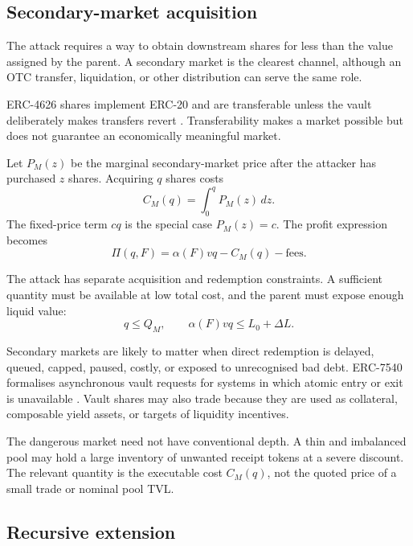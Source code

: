 \documentclass[11pt]{article}
\begin{document}
\subsection{Secondary-market acquisition}

The attack requires a way to obtain downstream shares for less than the value assigned by the parent.  A secondary market is the clearest channel, although an OTC transfer, liquidation, or other distribution can serve the same role.

ERC-4626 shares implement ERC-20 and are transferable unless the vault deliberately makes transfers revert \cite{erc4626}.  Transferability makes a market possible but does not guarantee an economically meaningful market.

Let $P_M(z)$ be the marginal secondary-market price after the attacker has purchased $z$ shares.  Acquiring $q$ shares costs
\begin{equation}
    C_M(q)=\int_0^q P_M(z)\,dz.
\end{equation}
The fixed-price term $cq$ is the special case $P_M(z)=c$.  The profit expression becomes
\begin{equation}
    \Pi(q,F)
    =\alpha(F)vq-C_M(q)-\text{fees}.
\end{equation}

The attack has separate acquisition and redemption constraints.  A sufficient quantity must be available at low total cost, and the parent must expose enough liquid value:
\begin{equation}
    q\leq Q_M,
    \qquad
    \alpha(F)vq\leq L_0+\Delta L.
\end{equation}

Secondary markets are likely to matter when direct redemption is delayed, queued, capped, paused, costly, or exposed to unrecognised bad debt.  ERC-7540 formalises asynchronous vault requests for systems in which atomic entry or exit is unavailable \cite{erc7540}.  Vault shares may also trade because they are used as collateral, composable yield assets, or targets of liquidity incentives.

The dangerous market need not have conventional depth.  A thin and imbalanced pool may hold a large inventory of unwanted receipt tokens at a severe discount.  The relevant quantity is the executable cost $C_M(q)$, not the quoted price of a small trade or nominal pool TVL.

\subsection{Recursive extension}
\end{document}
